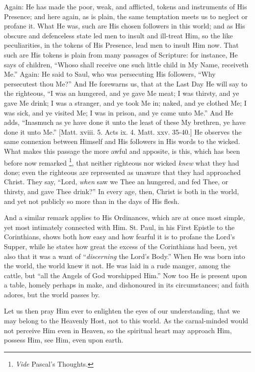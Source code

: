 Again: He has made the poor, weak, and afflicted, tokens and
instruments of His Presence; and here again, as is plain, the same
temptation meets us to neglect or profane it. What He was, such are
His chosen followers in this world; and as His obscure and defenceless
state led men to insult and ill-treat Him, so the like peculiarities,
in the tokens of His Presence, lead men to insult Him now. That such
are His tokens is plain from many passages of Scripture: for instance,
He says of children, ``Whoso shall receive one such little child
in My Name, receiveth Me.'' Again: He said to Saul, who was
persecuting His followers, ``Why persecutest thou Me?'' And He
forewarns us, that at the Last Day He will say to the righteous,
``I was an hungered, and ye gave Me meat; I was thirsty, and ye
gave Me drink; I was a stranger, and ye took Me in; naked, and ye
clothed Me; I was sick, and ye visited Me; I was in prison, and ye
came unto Me.'' And He adds, ``Inasmuch as ye have done it
unto the least of these My brethren, ye have done it unto Me.''
[Matt. xviii. 5. Acts ix. 4. Matt. xxv. 35-40.] He observes the same
connexion between Himself and His followers in His words to the
wicked. What makes this passage the more awful and apposite, is this,
which has been before now remarked \footnote{\emph{Vide} Pascal's Thoughts.}, that neither righteous nor wicked \emph{knew} what they
had done; even the righteous are represented as unaware that they had
approached Christ. They say, ``Lord, \emph{when} saw we Thee an
hungered, and fed Thee, or thirsty, and gave Thee drink?'' In
every age, then, Christ is both in the world, and yet not publicly so
more than in the days of His flesh.

And a similar remark applies to His Ordinances, which are at once
most simple, yet most intimately connected with Him. St. Paul, in his
First Epistle to the Corinthians, shows both how easy and how fearful
it is to profane the Lord's Supper, while he states how great the
excess of the Corinthians had been, yet also that it was a want of
``\emph{discerning} the Lord's Body.'' When He was born into
the world, the world knew it not. He was laid in a rude manger, among
the cattle, but ``all the Angels of God worshipped Him.'' Now
too He is present upon a table, homely perhaps in make, and
dishonoured in its circumstances; and faith adores, but the world
passes by.

Let us then pray Him ever to enlighten the eyes of our
understanding, that we may belong to the Heavenly Host, not to this
world. As the carnal-minded would not perceive Him even in Heaven, so
the spiritual heart may approach Him, possess Him, see Him, even upon
earth.

